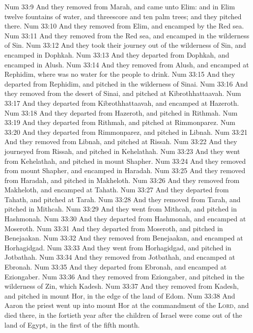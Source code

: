 \vs Num 33:9 And they removed from Marah, and came unto Elim: and in Elim  twelve fountains of water, and threescore and ten palm trees; and they pitched there.
\vs Num 33:10 And they removed from Elim, and encamped by the Red sea.
\vs Num 33:11 And they removed from the Red sea, and encamped in the wilderness of Sin.
\vs Num 33:12 And they took their journey out of the wilderness of Sin, and encamped in Dophkah.
\vs Num 33:13 And they departed from Dophkah, and encamped in Alush.
\vs Num 33:14 And they removed from Alush, and encamped at Rephidim, where was no water for the people to drink.
\vs Num 33:15 And they departed from Rephidim, and pitched in the wilderness of Sinai.
\vs Num 33:16 And they removed from the desert of Sinai, and pitched at Kibrothhattaavah.
\vs Num 33:17 And they departed from Kibrothhattaavah, and encamped at Hazeroth.
\vs Num 33:18 And they departed from Hazeroth, and pitched in Rithmah.
\vs Num 33:19 And they departed from Rithmah, and pitched at Rimmonparez.
\vs Num 33:20 And they departed from Rimmonparez, and pitched in Libnah.
\vs Num 33:21 And they removed from Libnah, and pitched at Rissah.
\vs Num 33:22 And they journeyed from Rissah, and pitched in Kehelathah.
\vs Num 33:23 And they went from Kehelathah, and pitched in mount Shapher.
\vs Num 33:24 And they removed from mount Shapher, and encamped in Haradah.
\vs Num 33:25 And they removed from Haradah, and pitched in Makheloth.
\vs Num 33:26 And they removed from Makheloth, and encamped at Tahath.
\vs Num 33:27 And they departed from Tahath, and pitched at Tarah.
\vs Num 33:28 And they removed from Tarah, and pitched in Mithcah.
\vs Num 33:29 And they went from Mithcah, and pitched in Hashmonah.
\vs Num 33:30 And they departed from Hashmonah, and encamped at Moseroth.
\vs Num 33:31 And they departed from Moseroth, and pitched in Benejaakan.
\vs Num 33:32 And they removed from Benejaakan, and encamped at Horhagidgad.
\vs Num 33:33 And they went from Horhagidgad, and pitched in Jotbathah.
\vs Num 33:34 And they removed from Jotbathah, and encamped at Ebronah.
\vs Num 33:35 And they departed from Ebronah, and encamped at Eziongaber.
\vs Num 33:36 And they removed from Eziongaber, and pitched in the wilderness of Zin, which  Kadesh.
\vs Num 33:37 And they removed from Kadesh, and pitched in mount Hor, in the edge of the land of Edom.
\vs Num 33:38 And Aaron the priest went up into mount Hor at the commandment of the \textsc{Lord}, and died there, in the fortieth year after the children of Israel were come out of the land of Egypt, in the first  of the fifth month.
